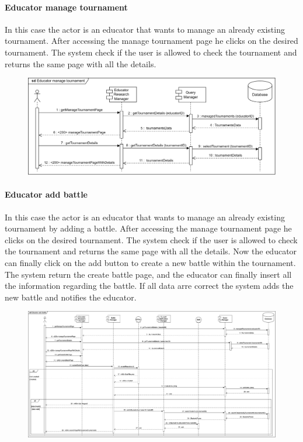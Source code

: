 \documentclass[12pt, a4paper]{report}
\begin{document}
    \paragraph*{Educator manage tournament}
    In this case the actor is an educator that wants to manage an already existing tournament. 
    After accessing the manage tournament page he clicks on the desired tournament. 
    The system check if the user is allowed to check the tournament and returns the same page with all the details. 
    \begin{figure}[H]
        \centering
        \includegraphics[width=1.0\linewidth]{images/emtrv.png}
    \end{figure}

    \paragraph*{Educator add battle}
    In this case the actor is an educator that wants to manage an already existing tournament by adding a battle. 
    After accessing the manage tournament page he clicks on the desired tournament. 
    The system check if the user is allowed to check the tournament and returns the same page with all the details. 
    Now the educator can finally click on the add button to create a new battle within the tournament. 
    The system return the create battle page, and the educator can finally insert all the information regarding the battle. 
    If all data arre correct the system adds the new battle and notifies the educator. 
    \begin{figure}[H]
        \centering
        \includegraphics[width=1.0\linewidth]{images/eabrv.png}
    \end{figure}
\end{document}
